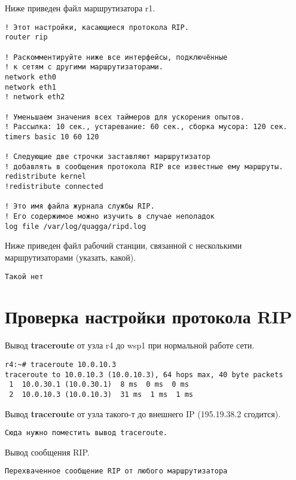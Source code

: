 \documentclass[a4paper,12pt]{article}
\begin{document}
Ниже приведен файл  маршрутизатора r1.

\begin{Verbatim}
! Этот настройки, касающиеся протокола RIP.
router rip

! Раскомментируйте ниже все интерфейсы, подключённые
! к сетям с другими маршрутизаторами.
network eth0
network eth1
! network eth2

! Уменьшаем значения всех таймеров для ускорения опытов.
! Рассылка: 10 сек., устаревание: 60 cек., сборка мусора: 120 сек.
timers basic 10 60 120

! Следующие две строчки заставляют маршрутизатор
! добавлять в сообщения протокола RIP все известные ему маршруты.
redistribute kernel
!redistribute connected

! Это имя файла журнала службы RIP.
! Его содержимое можно изучить в случае неполадок
log file /var/log/quagga/ripd.log
\end{Verbatim}



Ниже приведен файл  рабочий станции, связанной с несколькими маршрутизаторами (указать, какой).

\begin{Verbatim}
Такой нет
\end{Verbatim}


\section{Проверка настройки протокола RIP}

Вывод \textbf{traceroute} от узла r4 до wsp1 при нормальной работе сети.

\begin{Verbatim}
r4:~# traceroute 10.0.10.3
traceroute to 10.0.10.3 (10.0.10.3), 64 hops max, 40 byte packets
 1  10.0.30.1 (10.0.30.1)  8 ms  0 ms  0 ms
 2  10.0.10.3 (10.0.10.3)  31 ms  1 ms  1 ms
\end{Verbatim}

Вывод \textbf{traceroute} от узла такого-т до внешнего IP (195.19.38.2 сгодится).

\begin{Verbatim}
Сюда нужно поместить вывод traceroute.
\end{Verbatim}

Вывод сообщения RIP.

\begin{Verbatim}
Перехваченное сообщение RIP от любого маршрутизатора
\end{Verbatim}
\end{document}
